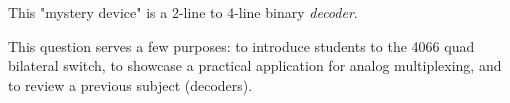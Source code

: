 





This "mystery device" is a 2-line to 4-line binary {\it decoder}.







This question serves a few purposes: to introduce students to the 4066 quad bilateral switch, to showcase a practical application for analog multiplexing, and to review a previous subject (decoders).




